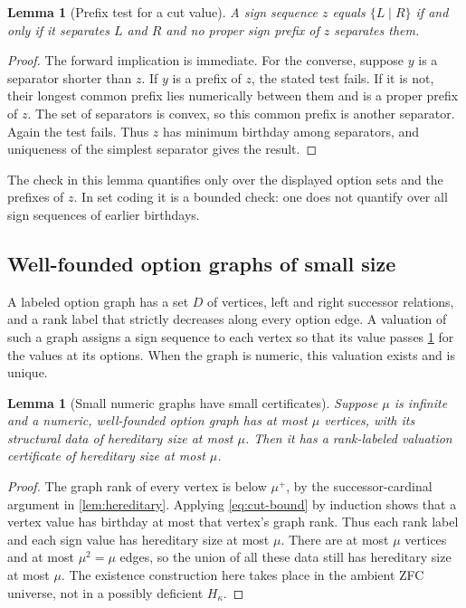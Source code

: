 \documentclass[11pt,letterpaper]{article}
\newtheorem{lemma}[theorem]{Lemma}
\theoremstyle{definition}
\theoremstyle{remark}
\begin{document}
\begin{lemma}[Prefix test for a cut value]
\label{lem:cut-test}
A sign sequence $z$ equals $\{L\mid R\}$ if and only if it separates $L$ and
$R$ and no proper sign prefix of $z$ separates them.
\end{lemma}
\begin{proof}
The forward implication is immediate. For the converse, suppose $y$ is a
separator shorter than $z$. If $y$ is a prefix of $z$, the stated test fails.
If it is not, their longest common prefix lies numerically between them and
is a proper prefix of $z$. The set of separators is convex, so this common
prefix is another separator. Again the test fails. Thus $z$ has minimum
birthday among separators, and uniqueness of the simplest separator gives
the result.
\end{proof}

The check in this lemma quantifies only over the displayed option sets and
the prefixes of $z$. In set coding it is a bounded check: one does not
quantify over all sign sequences of earlier birthdays.

\subsection{Well-founded option graphs of small size}

A labeled option graph has a set $D$ of vertices, left and right successor
relations, and a rank label that strictly decreases along every option edge.
A valuation of such a graph assigns a sign sequence to each vertex so that
its value passes \cref{lem:cut-test} for the values at its options. When the
graph is numeric, this valuation exists and is unique.

\begin{lemma}[Small numeric graphs have small certificates]
\label{lem:graph-size}
Suppose $\mu$ is infinite and a numeric, well-founded option graph has at
most $\mu$ vertices, with its structural data of hereditary size at most
$\mu$. Then it has a rank-labeled valuation certificate of hereditary size
at most $\mu$.
\end{lemma}
\begin{proof}
The graph rank of every vertex is below $\mu^+$, by the successor-cardinal
argument in \cref{lem:hereditary}. Applying \eqref{eq:cut-bound} by induction
shows that a vertex value has birthday at most that vertex's graph rank.
Thus each rank label and each sign value has hereditary size at most $\mu$.
There are at most $\mu$ vertices and at most $\mu^2=\mu$ edges, so the union
of all these data still has hereditary size at most $\mu$. The existence
construction here takes place in the ambient ZFC universe, not in a
possibly deficient $H_\kappa$.
\end{proof}
\end{document}
